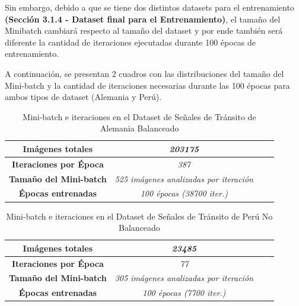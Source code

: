 		Sin embargo, debido a que se tiene dos distintos datasets para el entrenamiento \textbf{(Sección 3.1.4 - Dataset final para el Entrenamiento)}, el tamaño del Minibatch cambiará respecto al tamaño del dataset y por ende también será diferente la cantidad de iteraciones ejecutadas durante 100 épocas de entrenamiento. 

		A continuación, se presentan 2 cuadros con las distribuciones del tamaño del Mini-batch y la cantidad de iteraciones necesarias durante las 100 épocas para ambos tipos de dataset (Alemania y Perú).                
		

		\begin{table}[H]
			\begin{center}
			\caption{\small{Mini-batch e iteraciones en el Dataset de Señales de Tránsito de Alemania Balanceado}}
			\begin{tabular}{|>{\scriptsize}c|>{\scriptsize}c|>{\scriptsize}c|>{\scriptsize}c|}
			\hline
			\textbf{Imágenes totales }                 &\textit{203175}                       \\ \hline
			\textbf{Iteraciones por Época}                 &\textit{387}                             \\ \hline
			\textbf{Tamaño del Mini-batch}                 &\textit{525 imágenes analizadas por iteración}                       \\ \hline
			\textbf{Épocas entrenadas}                &\textit{100 épocas (38700 iter.)}                       \\ \hline
			\end{tabular}
			\end{center}
		\end{table}


		\begin{table}[H]
			\begin{center}
			\caption{\small{Mini-batch e iteraciones en el Dataset de Señales de Tránsito de Perú No Balanceado}}
			\begin{tabular}{|>{\scriptsize}c|>{\scriptsize}c|>{\scriptsize}c|>{\scriptsize}c|}
			\hline
			\textbf{Imágenes totales }                 &\textit{23485}                       \\ \hline
			\textbf{Iteraciones por Época}                 &\textit{77}                             \\ \hline
			\textbf{Tamaño del Mini-batch}                 &\textit{305 imágenes analizadas por iteración}                       \\ \hline
			\textbf{Épocas entrenadas}                &\textit{100 épocas (7700 iter.)}                       \\ \hline
			\end{tabular}
			\end{center}
		\end{table}




